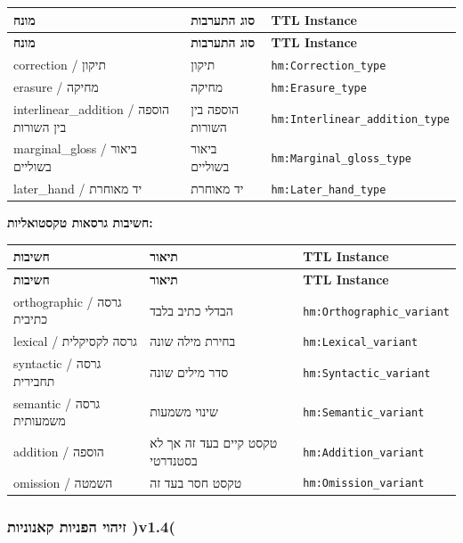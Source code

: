\documentclass[12pt,a4paper]{article}
\newcommand{\ttlclass}[1]{\texttt{#1}}
\begin{document}
\begin{longtable}{|p{4cm}|L{5cm}|L{7cm}|}
\hline
\textbf{מונח} & \textbf{סוג התערבות} & \textbf{TTL Instance} \\
\hline
\endfirsthead
\hline
\textbf{מונח} & \textbf{סוג התערבות} & \textbf{TTL Instance} \\
\hline
\endhead
\hline
\endfoot
correction / תיקון & תיקון & \ttlclass{hm:Correction\_type} \\
\hline
erasure / מחיקה & מחיקה & \ttlclass{hm:Erasure\_type} \\
\hline
interlinear\_addition / הוספה בין השורות & הוספה בין השורות & \ttlclass{hm:Interlinear\_addition\_type} \\
\hline
marginal\_gloss / ביאור בשוליים & ביאור בשוליים & \ttlclass{hm:Marginal\_gloss\_type} \\
\hline
later\_hand / יד מאוחרת & יד מאוחרת & \ttlclass{hm:Later\_hand\_type} \\
\hline
\end{longtable}

\textbf{חשיבות גרסאות טקסטואליות:}

\begin{longtable}{|p{4cm}|L{5cm}|L{7cm}|}
\hline
\textbf{חשיבות} & \textbf{תיאור} & \textbf{TTL Instance} \\
\hline
\endfirsthead
\hline
\textbf{חשיבות} & \textbf{תיאור} & \textbf{TTL Instance} \\
\hline
\endhead
\hline
\endfoot
orthographic / גרסה כתיבית & הבדלי כתיב בלבד & \ttlclass{hm:Orthographic\_variant} \\
\hline
lexical / גרסה לקסיקלית & בחירת מילה שונה & \ttlclass{hm:Lexical\_variant} \\
\hline
syntactic / גרסה תחבירית & סדר מילים שונה & \ttlclass{hm:Syntactic\_variant} \\
\hline
semantic / גרסה משמעותית & שינוי משמעות & \ttlclass{hm:Semantic\_variant} \\
\hline
addition / הוספה & טקסט קיים בעד זה אך לא בסטנדרטי & \ttlclass{hm:Addition\_variant} \\
\hline
omission / השמטה & טקסט חסר בעד זה & \ttlclass{hm:Omission\_variant} \\
\hline
\end{longtable}

\subsubsection{זיהוי הפניות קאנוניות )v1.4(}
\end{document}
